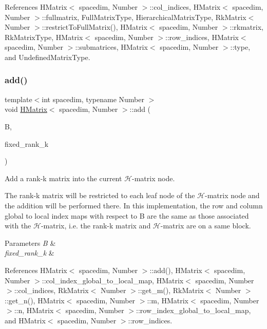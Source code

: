 References H\+Matrix$<$ spacedim, Number $>$\+::col\+\_\+indices, H\+Matrix$<$ spacedim, Number $>$\+::fullmatrix, Full\+Matrix\+Type, Hierarchical\+Matrix\+Type, Rk\+Matrix$<$ Number $>$\+::restrict\+To\+Full\+Matrix(), H\+Matrix$<$ spacedim, Number $>$\+::rkmatrix, Rk\+Matrix\+Type, H\+Matrix$<$ spacedim, Number $>$\+::row\+\_\+indices, H\+Matrix$<$ spacedim, Number $>$\+::submatrices, H\+Matrix$<$ spacedim, Number $>$\+::type, and Undefined\+Matrix\+Type.

\mbox{\label{classHMatrix_ab9000d7604e2045cf7cad7458daca340}} 
\subsubsection{\texorpdfstring{add()}{add()}\hspace{0.1cm}{\footnotesize\ttfamily [7/10]}}
{\footnotesize\ttfamily template$<$int spacedim, typename Number $>$ \\
void \hyperlink{classHMatrix}{H\+Matrix}$<$ spacedim, Number $>$\+::add (\begin{DoxyParamCaption}\item[{const \hyperlink{classRkMatrix}{Rk\+Matrix}$<$ Number $>$ \&}]{B,  }\item[{const \hyperlink{classHMatrix_a5ca8dc549783d38371a01ecd621ecb34}{size\+\_\+type}}]{fixed\+\_\+rank\+\_\+k }\end{DoxyParamCaption})}

Add a rank-\/k matrix into the current $\mathcal{H}$-\/matrix node.

The rank-\/k matrix will be restricted to each leaf node of the $\mathcal{H}$-\/matrix node and the addition will be performed there. In this implementation, the row and column global to local index maps with respect to {\ttfamily B} are the same as those associated with the $\mathcal{H}$-\/matrix, i.\+e. the rank-\/k matrix and $\mathcal{H}$-\/matrix are on a same block.


\begin{DoxyParams}{Parameters}
{\em B} & \\
\hline
{\em fixed\+\_\+rank\+\_\+k} & \\
\hline
\end{DoxyParams}


References H\+Matrix$<$ spacedim, Number $>$\+::add(), H\+Matrix$<$ spacedim, Number $>$\+::col\+\_\+index\+\_\+global\+\_\+to\+\_\+local\+\_\+map, H\+Matrix$<$ spacedim, Number $>$\+::col\+\_\+indices, Rk\+Matrix$<$ Number $>$\+::get\+\_\+m(), Rk\+Matrix$<$ Number $>$\+::get\+\_\+n(), H\+Matrix$<$ spacedim, Number $>$\+::m, H\+Matrix$<$ spacedim, Number $>$\+::n, H\+Matrix$<$ spacedim, Number $>$\+::row\+\_\+index\+\_\+global\+\_\+to\+\_\+local\+\_\+map, and H\+Matrix$<$ spacedim, Number $>$\+::row\+\_\+indices.

